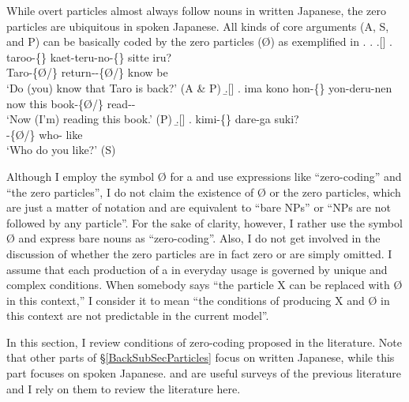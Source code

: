 While overt particles almost always follow nouns in written Japanese,
the zero particles are ubiquitous in spoken Japanese.
All kinds of core arguments (A, S, and P) can be basically coded by the zero particles ({\O}) as exemplified in \Next.
%
\ex. \a.[] 
	\bg. {taroo-\{\}} {kaet-teru-no-\{\}} sitte iru? \\
		Taro-\{{\O}/\} return--\{{\O}/\} know be \\
		`Do (you) know that Taro is back?' \hfill{(A \& P)}
	\b.[] 
	\bg. ima kono {hon-\{\}} yon-deru-nen \\
		now this book-\{{\O}/\} read-- \\
		`Now (I'm) reading this book.' \hfill{(P)}
	\b.[] 
	\bg. {kimi-\{\}} dare-ga suki? \\
		-\{{\O}/\} who- like \\
		`Who do you like?' \hfill{(S)}
		\begin{flushright}
		{\cite[pp.\ 367-368, glosses modified]{shibatani90}}
		\end{flushright}

Although I employ the symbol {\O} for a  and
use expressions like ``zero-coding'' and ``the zero particles'',
I do not claim the existence of {\O} or the zero particles,
which are just a matter of notation and
are equivalent to ``bare NPs'' or ``NPs are not followed by any particle''.
For the sake of clarity, however,
I rather use the symbol {\O} and express bare nouns as ``zero-coding''.
Also, I do not get involved in the discussion of whether
the zero particles are in fact zero or are simply omitted.
I assume that each production of a  in everyday usage is governed by unique and complex conditions.
When somebody says ``the particle X can be replaced with {\O} in this context,''
I consider it to mean ``the conditions of producing X and {\O} in this context are not predictable in the current model''.

In this section, I review conditions of zero-coding proposed in the literature.
Note that other parts of \S \ref{BackSubSecParticles}
focus on written Japanese,
while this part focuses on spoken Japanese.
 and  are useful surveys of the previous literature and
I rely on them to review the literature here.

